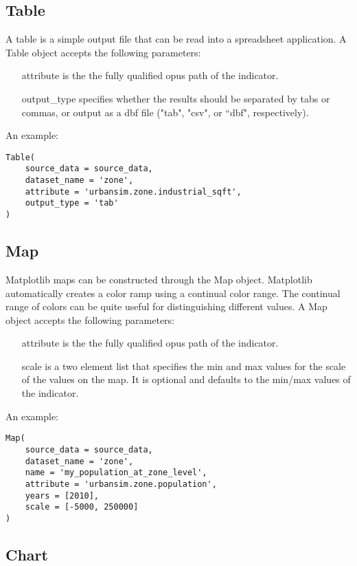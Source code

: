 \subsection{Table}
A table is a simple output file that can be read into a spreadsheet application. 
A Table object accepts the following parameters:

\begin{itemize}
\tight
\item[attribute] is the the fully qualified opus path of the indicator. 
\item[output_type] specifies whether the results should be separated 
by tabs or commas, or output as a dbf file ("tab", "csv", or ``dbf", respectively).
\end{itemize}

An example:
\begin{verbatim}
Table(
    source_data = source_data,
    dataset_name = 'zone',
    attribute = 'urbansim.zone.industrial_sqft',
    output_type = 'tab'
) 
\end{verbatim}

\subsection{Map}

Matplotlib maps can be constructed through the Map object. 
Matplotlib automatically creates a color
ramp using a continual color range.  The continual range of colors can be
quite useful for distinguishing different values. 
A Map object accepts the following parameters:

\begin{itemize}
\tight
\item[attribute] is the the fully qualified opus path of the indicator. 
\item[scale] is a two element list that specifies the min and max values 
for the scale of the values on the map. It is optional and defaults to the
min/max values of the indicator. 
\end{itemize}
  
An example:
\begin{verbatim}
Map( 
    source_data = source_data,
    dataset_name = 'zone',
    name = 'my_population_at_zone_level',
    attribute = 'urbansim.zone.population',
    years = [2010], 
    scale = [-5000, 250000]
)
\end{verbatim}

\subsection{Chart}

